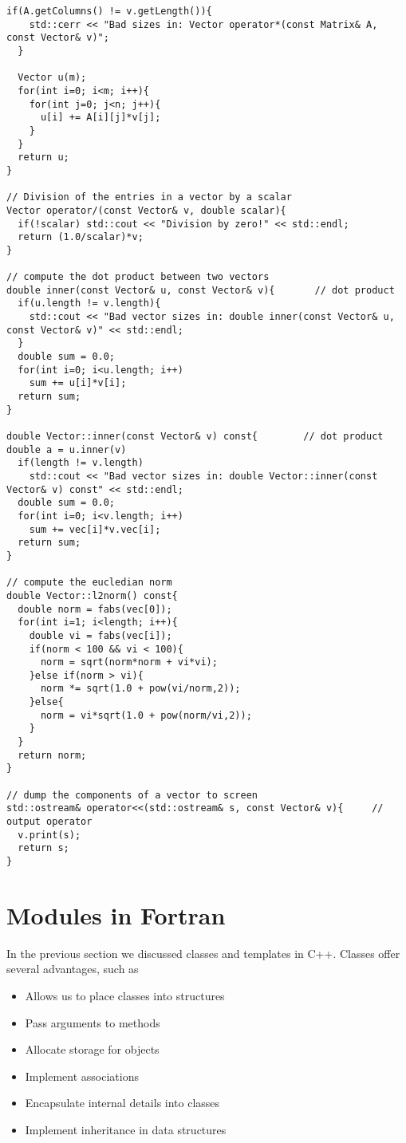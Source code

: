 \begin{lstlisting}[title={\url{http://folk.uio.no/mhjensen/compphys/programs/chapter03/cpp/Vector.cpp}}]
  if(A.getColumns() != v.getLength()){
    std::cerr << "Bad sizes in: Vector operator*(const Matrix& A, const Vector& v)";
  }

  Vector u(m);
  for(int i=0; i<m; i++){
    for(int j=0; j<n; j++){
      u[i] += A[i][j]*v[j];
    }
  }
  return u;  
}

// Division of the entries in a vector by a scalar
Vector operator/(const Vector& v, double scalar){ 
  if(!scalar) std::cout << "Division by zero!" << std::endl;
  return (1.0/scalar)*v;
}

// compute the dot product between two vectors
double inner(const Vector& u, const Vector& v){       // dot product
  if(u.length != v.length){
    std::cout << "Bad vector sizes in: double inner(const Vector& u, const Vector& v)" << std::endl;
  }
  double sum = 0.0;
  for(int i=0; i<u.length; i++)
    sum += u[i]*v[i];
  return sum;
}

double Vector::inner(const Vector& v) const{        // dot product double a = u.inner(v)
  if(length != v.length)
    std::cout << "Bad vector sizes in: double Vector::inner(const Vector& v) const" << std::endl;
  double sum = 0.0;
  for(int i=0; i<v.length; i++)
    sum += vec[i]*v.vec[i];
  return sum;
}

// compute the eucledian norm
double Vector::l2norm() const{
  double norm = fabs(vec[0]);
  for(int i=1; i<length; i++){
    double vi = fabs(vec[i]);
    if(norm < 100 && vi < 100){
      norm = sqrt(norm*norm + vi*vi);
    }else if(norm > vi){    
      norm *= sqrt(1.0 + pow(vi/norm,2));
    }else{      
      norm = vi*sqrt(1.0 + pow(norm/vi,2));
    }
  }
  return norm;  
}

// dump the components of a vector to screen
std::ostream& operator<<(std::ostream& s, const Vector& v){     // output operator
  v.print(s);
  return s;
}
\end{lstlisting}

\section{Modules in Fortran}
In the previous section we discussed classes and templates in C++.
Classes offer several advantages, such as 
     \begin{itemize}
          \item Allows us to place classes into structures
          \item Pass arguments to methods
          \item Allocate storage for objects
          \item Implement associations
          \item Encapsulate internal details into classes
          \item Implement inheritance in data structures
          \end{itemize} 

